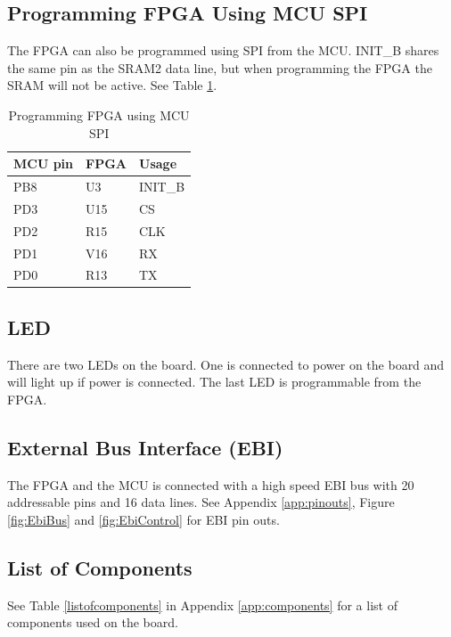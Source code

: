 \subsection{Programming FPGA Using MCU SPI}
The FPGA can also be programmed using SPI from the MCU.
INIT\_B shares the same pin as the SRAM2 data line, but when programming the FPGA the SRAM will not be active.
See Table \ref{tab:SpiProgrammer}.

\begin{table}[]
    \centering
    \begin{tabular}{lll}
        MCU pin & FPGA & Usage   \\
        \hline
        PB8     & U3   & INIT\_B \\
        PD3     & U15  & CS      \\
        PD2     & R15  & CLK     \\
        PD1     & V16  & RX      \\
        PD0     & R13  & TX
    \end{tabular}
    \caption{Programming FPGA using MCU SPI}
    \label{tab:SpiProgrammer}
\end{table}

\subsection{LED}
There are two LEDs on the board.
One is connected to power on the board and will light up if power is connected.
The last LED is programmable from the FPGA.

\subsection{External Bus Interface (EBI)}
The FPGA and the MCU is connected with a high speed EBI bus with 20 addressable pins and 16 data lines.
See Appendix \ref{app:pinouts}, Figure \ref{fig:EbiBus} and \ref{fig:EbiControl} for EBI pin outs.

\subsection{List of Components}
See Table \ref{listofcomponents} in Appendix \ref{app:components} for a list of components used on the board.
